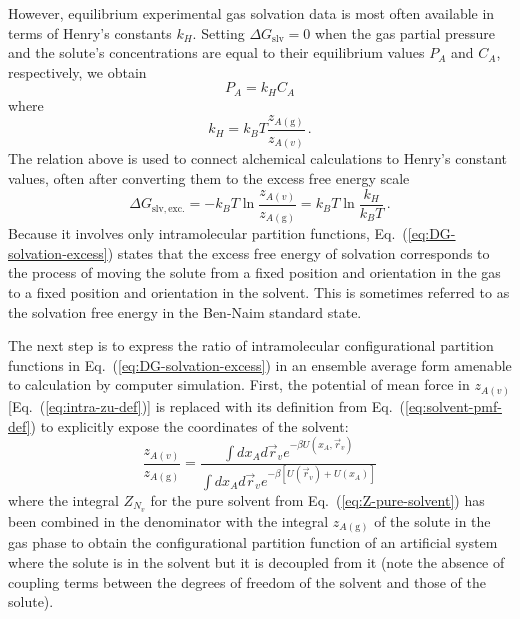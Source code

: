\documentclass[9pt,bestpractices,pubversion]{livecoms}
\begin{document}
However, equilibrium experimental gas solvation data is most often available in terms of Henry's constants $k_H$. Setting $\Delta G_{\mathrm{slv}} = 0$ when the gas partial pressure and the solute's concentrations are equal to their equilibrium values $P_A$ and $C_A$, respectively, we obtain
\begin{equation}
  P_A = k_H C_A
  \label{eq:Henrys-law}
\end{equation}
where
\begin{equation}
  k_H = k_B T \frac{z_{A(\mathrm{g})}}{z_{A(v)}} \, .
  \label{eq:Henrys-constant}
\end{equation}
The relation above is used to connect alchemical calculations to Henry's constant values, often after converting them to the excess free energy scale~\cite{nicholls2008predicting,mobley2014freesolv}
\begin{equation}
\Delta G_{\mathrm{slv, exc.}} = - k_B T \ln \frac{z_{A(v)}}{z_{A(\mathrm{g})}} = k_B T \ln \frac{k_H}{k_B T} \, .
\label{eq:DG-solvation-excess}
\end{equation}
Because it involves only intramolecular partition functions, Eq.~(\ref{eq:DG-solvation-excess}) states that the excess free energy of solvation corresponds to the process of moving the solute from a fixed position and orientation in the gas to a fixed position and orientation in the solvent. This is sometimes referred to as the solvation free energy in the Ben-Naim standard state.~\cite{bennaim1984solvation}

The next step is to express the ratio of intramolecular configurational partition functions in Eq.~(\ref{eq:DG-solvation-excess}) in an ensemble average form amenable to calculation by computer simulation. First, the potential of mean force in $z_{A(v)}$ [Eq.~(\ref{eq:intra-zu-def})] is replaced with its definition from Eq.~(\ref{eq:solvent-pmf-def}) to explicitly expose the coordinates of the solvent:
\begin{equation}
  \frac{z_{A(v)}}{z_{A(\mathrm{g})}} =
  \frac{
    \int dx_A d\vec{r}_v e^{-\beta U(x_A, \vec{r}_v)}
  }{
    \int dx_A d\vec{r}_v e^{-\beta [U(\vec{r}_v) + U(x_A)] }
  }
\end{equation}
where the integral $Z_{N_v}$ for the pure solvent from Eq.~(\ref{eq:Z-pure-solvent}) has been combined in the denominator with the integral $z_{A(\mathrm{g})}$ of the solute in the gas phase to obtain the configurational partition function of an artificial system where the solute is in the solvent but it is decoupled from it (note the absence of coupling terms between the degrees of freedom of the solvent and those of the solute).
\end{document}
